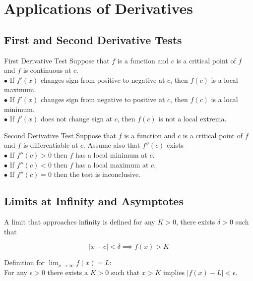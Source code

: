 \section{Applications of Derivatives}

    \subsection{First and Second Derivative Tests}

        \begin{tbhtheorem}{First Derivative Test}
            Suppose that $f$ is a function and $c$ is a critical point of $f$ and $f$ is continuous at $c$. \\
            $\bullet$ If $f'(x)$ changes sign from positive to negative at $c$, then $f(c)$ is a local maximum. \\
            $\bullet$ If $f'(x)$ changes sign from negative to positive at $c$, then $f(c)$ is a local minimum. \\
            $\bullet$ If $f'(x)$ does not change sign at $c$, then $f(c)$ is not a local extrema.
        \end{tbhtheorem}

        \begin{tbhtheorem}{Second Derivative Test}
            Suppose that $f$ is a function and $c$ is a critical point of $f$ and $f$ is differentiable at $c$. Assume also that $f''(c)$ exists \\
            $\bullet$ If $f''(c)>0$ then $f$ has a local minimum at $c$. \\
            $\bullet$ If $f''(c)<0$ then $f$ has a local maximum at $c$. \\
            $\bullet$ If $f''(c)=0$ then the test is inconclusive.
        \end{tbhtheorem}

    \subsection{Limits at Infinity and Asymptotes}

        A limit that approaches infinity is defined for any $K>0$, there exists $\delta > 0$ such that

        \[
            |x-c| < \delta \implies f(x) > K
        \]

        Definition for $\lim_{x\to \infty} f(x)=L$: \\

        For any $\epsilon > 0$ there exists a $K>0$ such that $x>K$ implies $|f(x) - L| < \epsilon$.

